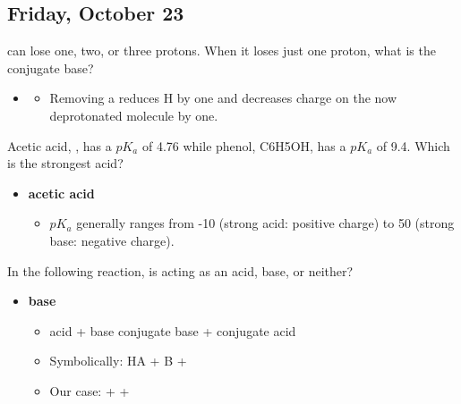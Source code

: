 \documentclass[12pt,a4paper]{article}
\begin{document}
\subsection{Friday, October 23}
\begin{enumerate}
    {\color{G-Moon}\item {} can lose one, two, or three protons. When it loses just one proton, what is the conjugate base?}
        \begin{itemize}
            \item {\color{o-Sun}\textbf{}}
                \begin{itemize}
                    \item Removing a {\color{pos}} reduces H by one and {\color{neg}decreases charge} on the now deprotonated molecule by one.
                \end{itemize}
        \end{itemize}
    {\color{G-Moon}\item Acetic acid, , has a \(pK_a\) of 4.76 while phenol, C6H5OH, has a \(pK_a\) of 9.4.  Which is the strongest acid?}
        \begin{itemize}
            \item {\color{o-Sun}\textbf{acetic acid}}
                \begin{itemize}
                    \item \(pK_a\) generally ranges from {\color{pos}-10 (strong acid: positive charge)} to {\color{neg}50 (strong base: negative charge)}.
                \end{itemize}
        \end{itemize}
    {\color{G-Moon}\item In the following reaction, is  acting as an acid, base, or neither?}
        \begin{itemize}
            \item {\color{o-Sun}\textbf{base}}
                \begin{itemize}
                    \item {\color{pos}acid} + {\color{neg}base} \ch{<>} {\color{neg}conjugate base} + {\color{pos}conjugate acid}
                    \item Symbolically: {\color{pos}HA} + {\color{neg}B} \ch{<>} {\color{neg}} + {\color{pos}}
                    \item Our case: {\color{pos}} + {\color{neg}} \ch{<>} {\color{neg}} + {\color{pos}}

\end{itemize}
\end{itemize}
\end{enumerate}
\end{document}
